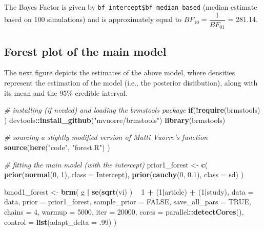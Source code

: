 \documentclass[floatsintext,doc]{apa6}
\newenvironment{Shaded}{\begin{snugshade}}{\end{snugshade}}
\newcommand{\CommentTok}[1]{\textcolor[rgb]{0.56,0.35,0.01}{\textit{#1}}}
\newcommand{\ControlFlowTok}[1]{\textcolor[rgb]{0.13,0.29,0.53}{\textbf{#1}}}
\newcommand{\DataTypeTok}[1]{\textcolor[rgb]{0.13,0.29,0.53}{#1}}
\newcommand{\DecValTok}[1]{\textcolor[rgb]{0.00,0.00,0.81}{#1}}
\newcommand{\FloatTok}[1]{\textcolor[rgb]{0.00,0.00,0.81}{#1}}
\newcommand{\KeywordTok}[1]{\textcolor[rgb]{0.13,0.29,0.53}{\textbf{#1}}}
\newcommand{\NormalTok}[1]{#1}
\newcommand{\OperatorTok}[1]{\textcolor[rgb]{0.81,0.36,0.00}{\textbf{#1}}}
\newcommand{\OtherTok}[1]{\textcolor[rgb]{0.56,0.35,0.01}{#1}}
\newcommand{\StringTok}[1]{\textcolor[rgb]{0.31,0.60,0.02}{#1}}
\begin{document}
The Bayes Factor is given by \texttt{bf\_intercept\$bf\_median\_based} (median estimate based on 100 simulations) and is approximately equal to \(BF_{10} = \dfrac{1}{BF_{01}}\) = 281.14.

\hypertarget{forest-plot-of-the-main-model}{%
\subsection{Forest plot of the main model}\label{forest-plot-of-the-main-model}}

The next figure depicts the estimates of the above model, where densities represent the estimation of the model (i.e., the posterior distibution), along with its mean and the 95\% credible interval.

\begin{Shaded}
\begin{Highlighting}[]
\CommentTok{# installing (if needed) and loading the brmstools package}
\ControlFlowTok{if}\NormalTok{(}\OperatorTok{!}\KeywordTok{require}\NormalTok{(brmstools) ) devtools}\OperatorTok{::}\KeywordTok{install_github}\NormalTok{(}\StringTok{"mvuorre/brmstools"}\NormalTok{)}
\KeywordTok{library}\NormalTok{(brmstools)}

\CommentTok{# sourcing a slightly modified version of Matti Vuorre's function}
\KeywordTok{source}\NormalTok{(}\KeywordTok{here}\NormalTok{(}\StringTok{"code"}\NormalTok{, }\StringTok{"forest.R"}\NormalTok{) )}

\CommentTok{# fitting the main model (with the intercept)}
\NormalTok{prior1_forest <-}\StringTok{ }\KeywordTok{c}\NormalTok{(}
    \KeywordTok{prior}\NormalTok{(}\KeywordTok{normal}\NormalTok{(}\DecValTok{0}\NormalTok{, }\DecValTok{1}\NormalTok{), }\DataTypeTok{class =}\NormalTok{ Intercept),}
    \KeywordTok{prior}\NormalTok{(}\KeywordTok{cauchy}\NormalTok{(}\DecValTok{0}\NormalTok{, }\FloatTok{0.1}\NormalTok{), }\DataTypeTok{class =}\NormalTok{ sd)}
\NormalTok{    )}

\NormalTok{bmod1_forest <-}\StringTok{ }\KeywordTok{brm}\NormalTok{(}
\NormalTok{    g }\OperatorTok{|}\StringTok{ }\KeywordTok{se}\NormalTok{(}\KeywordTok{sqrt}\NormalTok{(vi) ) }\OperatorTok{~}\StringTok{ }\DecValTok{1} \OperatorTok{+}\StringTok{ }\NormalTok{(}\DecValTok{1}\OperatorTok{|}\NormalTok{article) }\OperatorTok{+}\StringTok{ }\NormalTok{(}\DecValTok{1}\OperatorTok{|}\NormalTok{study),}
    \DataTypeTok{data =}\NormalTok{ data,}
    \DataTypeTok{prior =}\NormalTok{ prior1_forest,}
    \DataTypeTok{sample_prior =} \OtherTok{FALSE}\NormalTok{,}
    \DataTypeTok{save_all_pars =} \OtherTok{TRUE}\NormalTok{,}
    \DataTypeTok{chains =} \DecValTok{4}\NormalTok{,}
    \DataTypeTok{warmup =} \DecValTok{5000}\NormalTok{,}
    \DataTypeTok{iter =} \DecValTok{20000}\NormalTok{,}
    \DataTypeTok{cores =}\NormalTok{ parallel}\OperatorTok{::}\KeywordTok{detectCores}\NormalTok{(),}
    \DataTypeTok{control =} \KeywordTok{list}\NormalTok{(}\DataTypeTok{adapt_delta =} \FloatTok{.99}\NormalTok{)}
\NormalTok{    )}


\end{Highlighting}
\end{Shaded}
\end{document}
